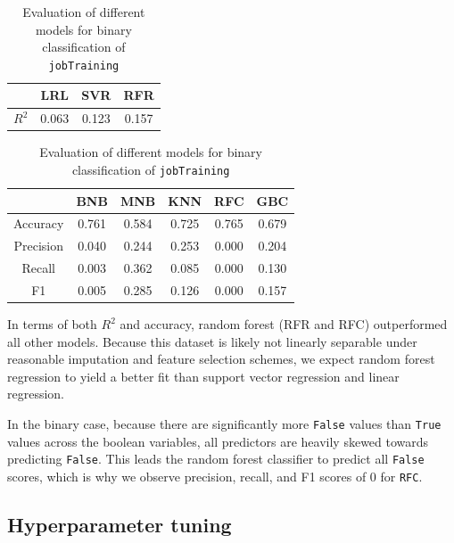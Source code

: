 \documentclass{article} %
\begin{document}
\begin{table}[H]
  \begin{minipage}{0.30\textwidth}
    \centering
    \begin{tabular}{| c | c | c | c |}
      \hline
      ~ & LRL & SVR & RFR \\ \hline
      $R^2$ & 0.063 & 0.123 & 0.157 \\
      \hline
    \end{tabular}
    \caption{Evaluation of different models for continuous regression of \texttt{gpa}}
    \label{tab:contresults}
  \end{minipage}%
  \hfill
  \begin{minipage}{0.60\textwidth}
    \centering
    \begin{tabular}{| c | c | c | c | c | c |}
      \hline
      ~ & BNB & MNB & KNN & RFC & GBC \\ \hline
      Accuracy & 0.761 & 0.584 & 0.725 & 0.765 & 0.679 \\
      Precision & 0.040 & 0.244 & 0.253 & 0.000 & 0.204 \\
      Recall & 0.003 & 0.362 & 0.085 & 0.000 & 0.130 \\
      F1 & 0.005 & 0.285 & 0.126 & 0.000 & 0.157 \\
      \hline
    \end{tabular}
    \caption{Evaluation of different models for binary classification of \texttt{jobTraining}}
    \label{tab:boolresults}
  \end{minipage}
\end{table}

In terms of both $R^2$ and accuracy, random forest (RFR and RFC) outperformed all other models. Because this dataset is likely not linearly separable under reasonable imputation and feature selection schemes, we expect random forest regression to yield a better fit than
support vector regression and linear regression.

In the binary case, because there are significantly more \texttt{False} values than \texttt{True} values across the boolean variables, all predictors are heavily skewed towards predicting \texttt{False}. This leads the random forest classifier to predict all \texttt{False} scores, which is why we observe precision, recall, and F1 scores of 0 for \texttt{RFC}.

\subsection{Hyperparameter tuning}
\label{sec:hyperparametertuning}
\end{document}
